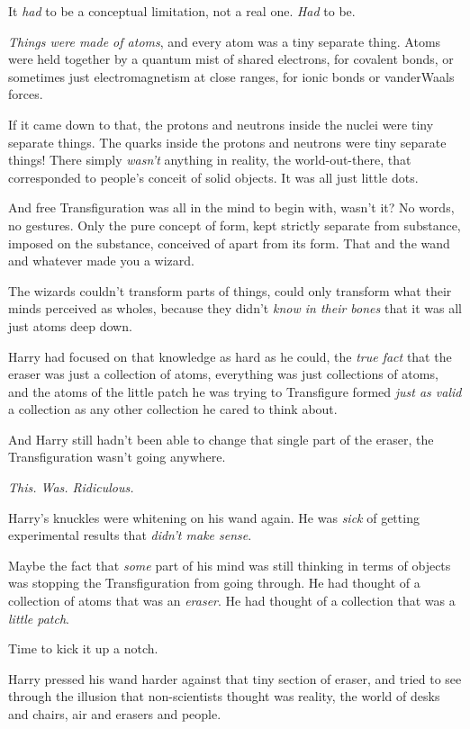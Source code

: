It \emph{had} to be a conceptual limitation, not a real one. \emph{Had} to be.

\emph{Things were made of atoms}, and every atom was a tiny separate thing. Atoms were held together by a quantum mist of shared electrons, for covalent bonds, or sometimes just electromagnetism at close ranges, for ionic bonds or van\?der\?Waals forces.

If it came down to that, the protons and neutrons inside the nuclei were tiny separate things. The quarks inside the protons and neutrons were tiny separate things! There simply \emph{wasn't} anything in reality, the world-out-there, that corresponded to people's conceit of solid objects. It was all just little dots.

And free Transfiguration was all in the mind to begin with, wasn't it? No words, no gestures. Only the pure concept of form, kept strictly separate from substance, imposed on the substance, conceived of apart from its form. That and the wand and whatever made you a wizard.

The wizards couldn't transform parts of things, could only transform what their minds perceived as wholes, because they didn't \emph{know in their bones} that it was all just atoms deep down.

Harry had focused on that knowledge as hard as he could, the \emph{true fact} that the eraser was just a collection of atoms, everything was just collections of atoms, and the atoms of the little patch he was trying to Transfigure formed \emph{just as valid} a collection as any other collection he cared to think about.

And Harry still hadn't been able to change that single part of the eraser, the Transfiguration wasn't going anywhere.

\emph{This. Was. Ridiculous.}

Harry's knuckles were whitening on his wand again. He was \emph{sick} of getting experimental results that \emph{didn't make sense}.

Maybe the fact that \emph{some} part of his mind was still thinking in terms of objects was stopping the Transfiguration from going through. He had thought of a collection of atoms that was an \emph{eraser}. He had thought of a collection that was a \emph{little patch}.

Time to kick it up a notch.

Harry pressed his wand harder against that tiny section of eraser, and tried to see through the illusion that non-scientists thought was reality, the world of desks and chairs, air and erasers and people.


